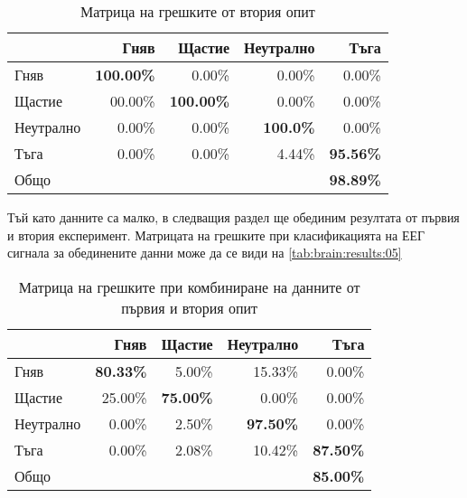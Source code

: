 \documentclass[main.tex]{subfiles}
\begin{document}
\begin{table}[h]
    \begin{center}
    \begin{tabular}{|l|r r r r|} 
        \hline
        & Гняв & Щастие & Неутрално & Тъга \\ 
        \hline
        Гняв &  \textbf{100.00\%} & 0.00\% & 0.00\% & 0.00\% \\ 
        Щастие & 00.00\% & \textbf{100.00\%} & 0.00\% & 0.00\% \\ 
        Неутрално & 0.00\% & 0.00\% & \textbf{100.0\%} & 0.00\% \\ 
        Тъга & 0.00\% & 0.00\% & 4.44\% & \textbf{95.56\%}\\ 
        \hline
        \hline
        Общо & & & & \textbf{98.89\%}\\
        \hline
    \end{tabular}
    \caption{Матрица на грешките от втория опит}
    \label{tab:brain:results:04}
    \end{center}
\end{table}

Тъй като данните са малко, в следващия раздел ще обединим резултата от първия и втория експеримент. Матрицата на грешките при класификацията на ЕЕГ сигнала за обединените данни може да се види на \autoref{tab:brain:results:05}

\begin{table}[h]
    \begin{center}
    \begin{tabular}{|l|r r r r|} 
        \hline
        & Гняв & Щастие & Неутрално & Тъга \\ 
        \hline
        Гняв &  \textbf{80.33\%} & 5.00\% & 15.33\% & 0.00\% \\ 
        Щастие & 25.00\% & \textbf{75.00\%} & 0.00\% & 0.00\% \\ 
        Неутрално & 0.00\% & 2.50\% & \textbf{97.50\%} & 0.00\% \\ 
        Тъга & 0.00\% & 2.08\% & 10.42\% & \textbf{87.50\%}\\ 
        \hline
        \hline
        Общо & & & & \textbf{85.00\%}\\
        \hline
    \end{tabular}
    \caption{Матрица на грешките при комбиниране на данните от първия и втория опит}
    \label{tab:brain:results:05}
    \end{center}
\end{table}
\end{document}

